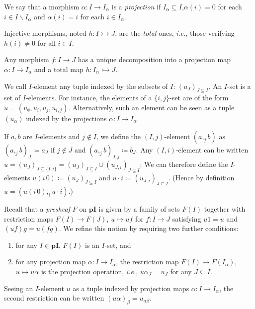 \documentclass[english]{PaperTools/latex/lipics}
\def\pI{\ensuremath{\mathbf{pI}}}
\def\ie{\textit{i.e.}}
\begin{document}
  \begin{definition}[Projection]
    We say that a morphism $α : I → I_α$ is a \emph{projection} if $I_α ⊆ I$,$α(i) = 0$
    for each $i ∈ I \backslash I_α$ and $α(i) = i$ for each $i ∈ I_α$.
  \end{definition}
  \begin{definition}
  Injective morphisms, noted $h : I ↣ J$, are the \emph{total} ones, \ie,
  those verifying $h(i) ≠ 0$ for all $i ∈ I$.
  \end{definition}
  \begin{remark}
  Any morphism $f : I → J$ has a
  unique decomposition into a projection map
  $α : I → I_α$ and a total map $h : I_α ↣ J$.
%
  \end{remark}

\begin{definition}[$I$-set]
  We call $I$-element any tuple indexed by the subsets of $I$: $(u_J)_{J ⊆ I}$.
  An $I$-set is a set of $I$-elements.  For instance, the elements of a
  $\{i,j\}$-set are of the form $u = (u_∅,u_i,u_j,u_{i,j})$.
  Alternatively, such an element can be seen as a tuple $(u_α)$ indexed
  by the projections $α : I → I_α$.
\end{definition}
  If $a,b$ are $I$-elements and $j ∉ I$, we define the $(I,j)$-element
  $(a ,_j b)$ as $(a ,_j b)_J ≔ a_J$ if $j ∉ J$ and $(a ,_j b)_{J,j} ≔ b_J$.
  Any $(I,i)$-element can be written $u = (u_J)_{J ⊆ \{I,i\}} = (u_J)_{J ⊆ I} ∪ (u_{J,i})_{J ⊆ I}$;
  We can therefore define the $I$-elements $u (i\,0) ≔ (u_J)_{J ⊆ I}$ and $u · i ≔ (u_{J,i})_{J ⊆ I}$.
  (Hence by definition $u = (u (i\,0) ,_i u · i)$.)

\bigskip
Recall that a \emph{presheaf} $F$ on \pI{} is given by a family of sets $F(I)$ together
with restriction maps $F(I) → F(J)$, $u ↦ uf$ for $f : I → J$
satisfying $u1 = u$ and $(uf)g = u(fg)$. We refine this notion by requiring
two further conditions:
%
\begin{enumerate}
  \item for any $I ∈ \pI$, $F(I)$ is an $I$-set, and
  \item for any projection map $α : I → I_α$, the restriction
    map $F(I) → F(I_α)$, $u ↦ uα$ is the projection operation, \ie,
    $uα_J = u_J$ for any $J ⊆ I$.
\end{enumerate}
%
Seeing an $I$-element $u$ as a tuple indexed by projection maps
$α : I → I_α$, the second restriction can be written $(uα)_β = u_{αβ}$.
\end{document}
